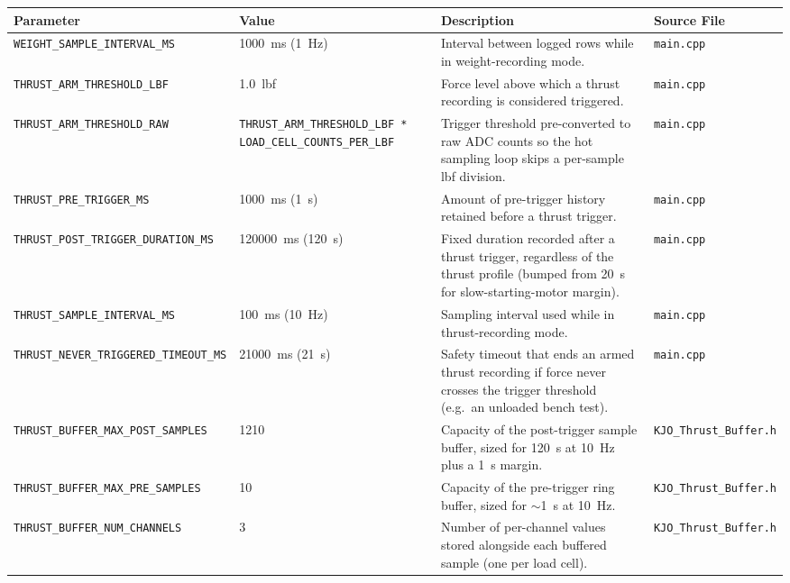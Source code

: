 ﻿\documentclass[11pt,letterpaper]{article}
\begin{document}
\begingroup
\footnotesize
\begin{longtable}{@{}p{3.2cm}p{2.4cm}p{6.2cm}p{2.6cm}@{}}
\toprule
Parameter & Value & Description & Source File \\
\midrule
\texttt{WEIGHT\_\allowbreak SAMPLE\_\allowbreak INTERVAL\_\allowbreak MS} & 1000~ms (1~Hz) & Interval between logged rows while in weight-recording mode. & \texttt{main.cpp} \\
\texttt{THRUST\_\allowbreak ARM\_\allowbreak THRESHOLD\_\allowbreak LBF} & 1.0~lbf & Force level above which a thrust recording is considered triggered. & \texttt{main.cpp} \\
\texttt{THRUST\_\allowbreak ARM\_\allowbreak THRESHOLD\_\allowbreak RAW} & \texttt{THRUST\_\allowbreak ARM\_\allowbreak THRESHOLD\_\allowbreak LBF * LOAD\_\allowbreak CELL\_\allowbreak COUNTS\_\allowbreak PER\_\allowbreak LBF} & Trigger threshold pre-converted to raw ADC counts so the hot sampling loop skips a per-sample lbf division. & \texttt{main.cpp} \\
\texttt{THRUST\_\allowbreak PRE\_\allowbreak TRIGGER\_\allowbreak MS} & 1000~ms (1~s) & Amount of pre-trigger history retained before a thrust trigger. & \texttt{main.cpp} \\
\texttt{THRUST\_\allowbreak POST\_\allowbreak TRIGGER\_\allowbreak DURATION\_\allowbreak MS} & 120000~ms (120~s) & Fixed duration recorded after a thrust trigger, regardless of the thrust profile (bumped from 20~s for slow-starting-motor margin). & \texttt{main.cpp} \\
\texttt{THRUST\_\allowbreak SAMPLE\_\allowbreak INTERVAL\_\allowbreak MS} & 100~ms (10~Hz) & Sampling interval used while in thrust-recording mode. & \texttt{main.cpp} \\
\texttt{THRUST\_\allowbreak NEVER\_\allowbreak TRIGGERED\_\allowbreak TIMEOUT\_\allowbreak MS} & 21000~ms (21~s) & Safety timeout that ends an armed thrust recording if force never crosses the trigger threshold (e.g.\ an unloaded bench test). & \texttt{main.cpp} \\
\texttt{THRUST\_\allowbreak BUFFER\_\allowbreak MAX\_\allowbreak POST\_\allowbreak SAMPLES} & 1210 & Capacity of the post-trigger sample buffer, sized for 120~s at 10~Hz plus a 1~s margin. & \texttt{KJO\_\allowbreak Thrust\_\allowbreak Buffer.h} \\
\texttt{THRUST\_\allowbreak BUFFER\_\allowbreak MAX\_\allowbreak PRE\_\allowbreak SAMPLES} & 10 & Capacity of the pre-trigger ring buffer, sized for $\sim$1~s at 10~Hz. & \texttt{KJO\_\allowbreak Thrust\_\allowbreak Buffer.h} \\
\texttt{THRUST\_\allowbreak BUFFER\_\allowbreak NUM\_\allowbreak CHANNELS} & 3 & Number of per-channel values stored alongside each buffered sample (one per load cell). & \texttt{KJO\_\allowbreak Thrust\_\allowbreak Buffer.h} \\
\end{longtable}
\endgroup
\end{document}
